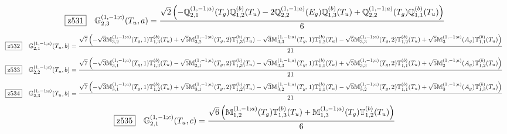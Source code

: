 \documentclass[fleqn,10pt,landscape]{jsarticle}
\begin{document}
\begin{dmath*}
\hspace*{3mm}\fbox{z531}\quad \mathbb{G}_{2,3}^{(1,-1;c)}(T_{u},a)=\frac{\sqrt{2} \left(- \mathbb{Q}_{2,1}^{(1,-1;a)}(T_{g}) \mathbb{Q}_{1,2}^{(b)}(T_{u}) - 2 \mathbb{Q}_{2,2}^{(1,-1;a)}(E_{g}) \mathbb{Q}_{1,3}^{(b)}(T_{u}) + \mathbb{Q}_{2,2}^{(1,-1;a)}(T_{g}) \mathbb{Q}_{1,1}^{(b)}(T_{u})\right)}{6}
\end{dmath*}
\begin{dmath*}
\hspace*{3mm}\fbox{z532}\quad \mathbb{G}_{2,1}^{(1,-1;c)}(T_{u},b)=\frac{\sqrt{7} \left(- \sqrt{3} \mathbb{M}_{3,2}^{(1,-1;a)}(T_{g},1) \mathbb{T}_{1,3}^{(b)}(T_{u}) + \sqrt{5} \mathbb{M}_{3,2}^{(1,-1;a)}(T_{g},2) \mathbb{T}_{1,3}^{(b)}(T_{u}) - \sqrt{3} \mathbb{M}_{3,3}^{(1,-1;a)}(T_{g},1) \mathbb{T}_{1,2}^{(b)}(T_{u}) - \sqrt{5} \mathbb{M}_{3,3}^{(1,-1;a)}(T_{g},2) \mathbb{T}_{1,2}^{(b)}(T_{u}) + \sqrt{5} \mathbb{M}_{3}^{(1,-1;a)}(A_{g}) \mathbb{T}_{1,1}^{(b)}(T_{u})\right)}{21}
\end{dmath*}
\begin{dmath*}
\hspace*{3mm}\fbox{z533}\quad \mathbb{G}_{2,2}^{(1,-1;c)}(T_{u},b)=\frac{\sqrt{7} \left(- \sqrt{3} \mathbb{M}_{3,1}^{(1,-1;a)}(T_{g},1) \mathbb{T}_{1,3}^{(b)}(T_{u}) - \sqrt{5} \mathbb{M}_{3,1}^{(1,-1;a)}(T_{g},2) \mathbb{T}_{1,3}^{(b)}(T_{u}) - \sqrt{3} \mathbb{M}_{3,3}^{(1,-1;a)}(T_{g},1) \mathbb{T}_{1,1}^{(b)}(T_{u}) + \sqrt{5} \mathbb{M}_{3,3}^{(1,-1;a)}(T_{g},2) \mathbb{T}_{1,1}^{(b)}(T_{u}) + \sqrt{5} \mathbb{M}_{3}^{(1,-1;a)}(A_{g}) \mathbb{T}_{1,2}^{(b)}(T_{u})\right)}{21}
\end{dmath*}
\begin{dmath*}
\hspace*{3mm}\fbox{z534}\quad \mathbb{G}_{2,3}^{(1,-1;c)}(T_{u},b)=\frac{\sqrt{7} \left(- \sqrt{3} \mathbb{M}_{3,1}^{(1,-1;a)}(T_{g},1) \mathbb{T}_{1,2}^{(b)}(T_{u}) + \sqrt{5} \mathbb{M}_{3,1}^{(1,-1;a)}(T_{g},2) \mathbb{T}_{1,2}^{(b)}(T_{u}) - \sqrt{3} \mathbb{M}_{3,2}^{(1,-1;a)}(T_{g},1) \mathbb{T}_{1,1}^{(b)}(T_{u}) - \sqrt{5} \mathbb{M}_{3,2}^{(1,-1;a)}(T_{g},2) \mathbb{T}_{1,1}^{(b)}(T_{u}) + \sqrt{5} \mathbb{M}_{3}^{(1,-1;a)}(A_{g}) \mathbb{T}_{1,3}^{(b)}(T_{u})\right)}{21}
\end{dmath*}
\begin{dmath*}
\hspace*{3mm}\fbox{z535}\quad \mathbb{G}_{2,1}^{(1,-1;c)}(T_{u},c)=\frac{\sqrt{6} \left(\mathbb{M}_{1,2}^{(1,-1;a)}(T_{g}) \mathbb{T}_{1,3}^{(b)}(T_{u}) + \mathbb{M}_{1,3}^{(1,-1;a)}(T_{g}) \mathbb{T}_{1,2}^{(b)}(T_{u})\right)}{6}
\end{dmath*}
\end{document}
